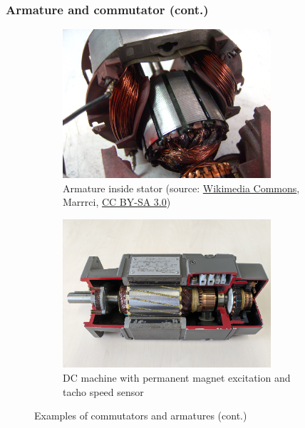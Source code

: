 \begin{frame}
	\frametitle{Armature and commutator (cont.)}
    \begin{figure}
		\centering
		\begin{subfigure}[b]{0.49\textwidth}
			\centering
			\includegraphics[width=0.85\textwidth]{fig/lec03/Stator_Rotor_Universalmachine.jpg}
			\caption{Armature inside stator (source: \href{https://commons.wikimedia.org/wiki/File:Universalmotor_1.JPG}{Wikimedia Commons}, Marrrci, \href{https://creativecommons.org/licenses/by-sa/3.0/deed.en}{CC BY-SA 3.0})}
		\end{subfigure}
		\hfill
		\begin{subfigure}[b]{0.49\textwidth}
			\centering
			\includegraphics[width=0.85\textwidth]{fig/lec03/DC_Machine_PM.jpg}
			\caption{DC machine with permanent magnet excitation and tacho speed sensor}
		\end{subfigure}
		\caption{Examples of commutators and armatures (cont.)} 
        \label{fig:Armature_and_commutator_02}
	\end{figure}
\end{frame}

